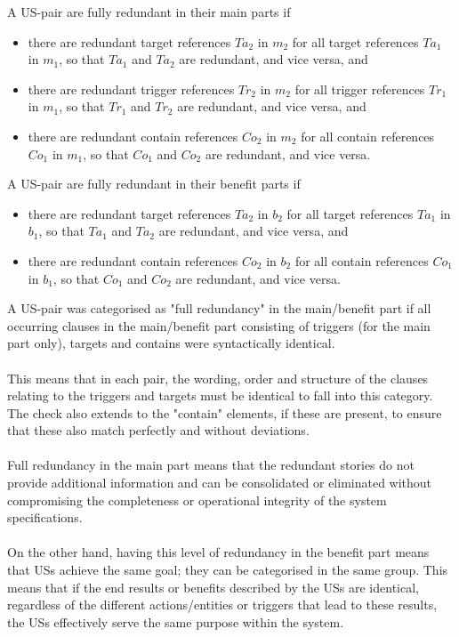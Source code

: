 \begin{definition}
	A US-pair are fully redundant in their main parts if
	\begin{itemize}
		\item there are redundant target references $Ta_2$ in $m_2$ for all target references $Ta_1$ in $m_1$, so that $Ta_1$ and $Ta_2$ are redundant, and vice versa, and
		
		\item there are redundant trigger references $Tr_2$ in $m_2$ for all trigger references $Tr_1$ in $m_1$, so that $Tr_1$ and $Tr_2$ are redundant, and vice versa, and
		
		\item there are redundant contain references $Co_2$ in $m_2$ for all contain references $Co_1$ in $m_1$, so that $Co_1$ and $Co_2$ are redundant, and vice versa.
		
	\end{itemize}
	A US-pair are fully redundant in their benefit parts if
	\begin{itemize}
		\item there are redundant target references $Ta_2$ in $b_2$ for all target references $Ta_1$ in $b_1$, so that $Ta_1$ and $Ta_2$ are redundant, and vice versa, and
		
		\item there are redundant contain references $Co_2$ in $b_2$ for all contain references $Co_1$ in $b_1$, so that $Co_1$ and $Co_2$ are redundant, and vice versa.
		
	\end{itemize}
	A US-pair was categorised as "full redundancy" in the main/benefit part if all occurring clauses in the main/benefit part consisting of triggers (for the main part only), targets and contains were syntactically identical.\\\\
	This means that in each pair, the wording, order and structure of the clauses relating to the triggers and targets must be identical to fall into this category. The check also extends to the "contain" elements, if these are present, to ensure that these also match perfectly and without deviations.\\\\
	Full redundancy in the main part means that the redundant stories do not provide additional information and can be consolidated or eliminated without compromising the completeness or operational integrity of the system specifications.\\\\
	On the other hand, having this level of redundancy in the benefit part means that USs achieve the same goal; they can be categorised in the same group. This means that if the end results or benefits described by the USs are identical, regardless of the different actions/entities or triggers that lead to these results, the USs effectively serve the same purpose within the system.
\end{definition}
